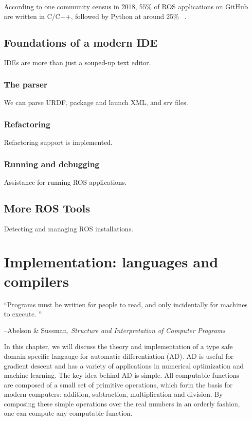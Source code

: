 \documentclass[12pt,initial,twoside,maitrise]{dms}
\numberwithin{equation}{section}
\numberwithin{table}{chapter}
\numberwithin{figure}{chapter}
\begin{document}
According to one community census in 2018, 55\% of ROS applications on GitHub are written in C/C++, followed by Python at around 25\% ~\cite{Areserio54:online}.

\section{Foundations of a modern IDE}

IDEs are more than just a souped-up text editor.

\subsection{The parser}

We can parse URDF, package and launch XML, and srv files.

\subsection{Refactoring}

Refactoring support is implemented.

\subsection{Running and debugging}

Assistance for running ROS applications.

\section{More ROS Tools}

Detecting and managing ROS installations.

\chapter{Implementation: languages and compilers}\label{ch:kotlingrad}

\epigraph{``Programs must be written for people to read, and only incidentally for machines to execute. ''}{\begin{flushright}--Abelson \& Sussman, \textit{Structure and Interpretation of Computer Programs}\end{flushright}}

In this chapter, we will discuss the theory and implementation of a type safe domain specific langauge for automatic differentiation (AD). AD is useful for gradient descent and has a variety of applications in numerical optimization and machine learning. The key idea behind AD is simple. All computable functions are composed of a small set of primitive operations, which form the basis for modern computers: addition, subtraction, multiplication and division. By composing these simple operations over the real numbers in an orderly fashion, one can compute any computable function.
\end{document}
